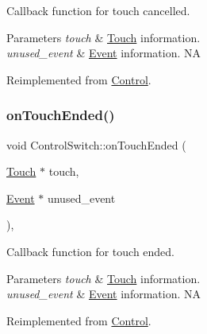 Callback function for touch cancelled.


\begin{DoxyParams}{Parameters}
{\em touch} & \hyperlink{classTouch}{Touch} information. \\
\hline
{\em unused\+\_\+event} & \hyperlink{classEvent}{Event} information.  NA \\
\hline
\end{DoxyParams}


Reimplemented from \hyperlink{classControl_a573efad6a6b492f4a6f4c5d06f0cdb88}{Control}.

\mbox{\label{classControlSwitch_a13db70a616ea0e992710fc8041792f66}} 
\subsubsection{\texorpdfstring{on\+Touch\+Ended()}{onTouchEnded()}\hspace{0.1cm}{\footnotesize\ttfamily [1/2]}}
{\footnotesize\ttfamily void Control\+Switch\+::on\+Touch\+Ended (\begin{DoxyParamCaption}\item[{\hyperlink{classTouch}{Touch} $\ast$}]{touch,  }\item[{\hyperlink{classEvent}{Event} $\ast$}]{unused\+\_\+event }\end{DoxyParamCaption})\hspace{0.3cm}{\ttfamily [override]}, {\ttfamily [virtual]}}

Callback function for touch ended.


\begin{DoxyParams}{Parameters}
{\em touch} & \hyperlink{classTouch}{Touch} information. \\
\hline
{\em unused\+\_\+event} & \hyperlink{classEvent}{Event} information.  NA \\
\hline
\end{DoxyParams}


Reimplemented from \hyperlink{classControl_a56073e57060169fe80cbb6ce1f4abe28}{Control}.

\mbox{\label{classControlSwitch_a6976aba81f0846eb827114efc06301d3}} 
